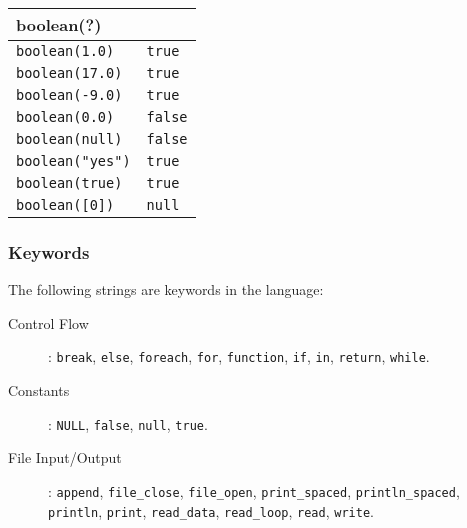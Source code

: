 \begin{multicols}{2}
  \begin{center}
    \begin{tabular}{|p{1.7in}|p{1.0in}|}
      \hline
      \multicolumn{2}{|l|}{\textbf{boolean(?)}}\\
      \hline
      {\tt boolean(1.0)} & {\tt true}\\
      {\tt boolean(17.0)} & {\tt true}\\
      {\tt boolean(-9.0)} & {\tt true}\\
      {\tt boolean(0.0)} & {\tt false}\\
      {\tt boolean(null)}& {\tt false}\\
      {\tt boolean("yes")}&{\tt true}\\
      {\tt boolean(true)}& {\tt true}\\
      {\tt boolean([0])} & {\tt null}\\
      \hline
    \end{tabular}
  \end{center}
\end{multicols}
\subsubsection{Keywords}

The following strings are keywords in the language: 
\begin{description}
\item[Control Flow]: 
\texttt{break},
\texttt{else},
\texttt{foreach},
\texttt{for},
\texttt{function},
\texttt{if},
\texttt{in},
\texttt{return},
\texttt{while}.
\item[Constants]:
\texttt{NULL},
\texttt{false},
\texttt{null},
\texttt{true}.
\item[File Input/Output]:
\texttt{append},
\texttt{file\_close},
\texttt{file\_open},
\texttt{print\_spaced},
\texttt{println\_spaced},
\texttt{println},
\texttt{print},
\texttt{read\_data},
\texttt{read\_loop},
\texttt{read},
\texttt{write}.
\end{description}

